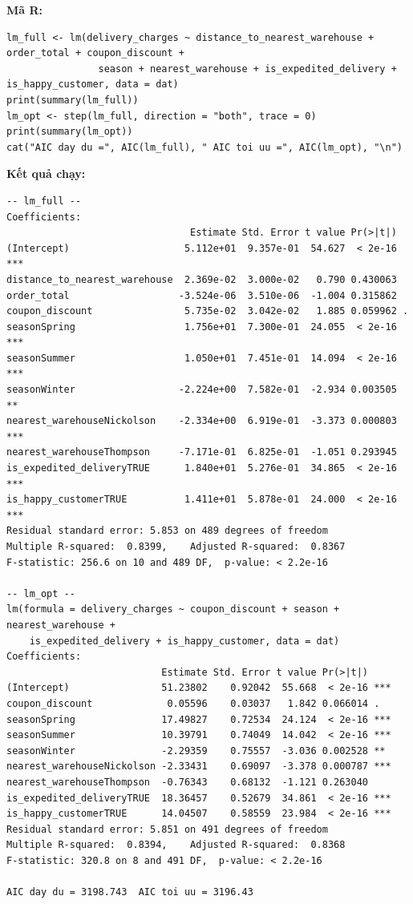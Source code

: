 \textbf{Mã R:}
\begin{lstlisting}
lm_full <- lm(delivery_charges ~ distance_to_nearest_warehouse + order_total + coupon_discount +
                season + nearest_warehouse + is_expedited_delivery + is_happy_customer, data = dat)
print(summary(lm_full))
lm_opt <- step(lm_full, direction = "both", trace = 0)  
print(summary(lm_opt))
cat("AIC day du =", AIC(lm_full), " AIC toi uu =", AIC(lm_opt), "\n")
\end{lstlisting}
\textbf{Kết quả chạy:}
\begin{lstlisting}[style=rout]
-- lm_full --
Coefficients:
                                Estimate Std. Error t value Pr(>|t|)    
(Intercept)                    5.112e+01  9.357e-01  54.627  < 2e-16 ***
distance_to_nearest_warehouse  2.369e-02  3.000e-02   0.790 0.430063    
order_total                   -3.524e-06  3.510e-06  -1.004 0.315862    
coupon_discount                5.735e-02  3.042e-02   1.885 0.059962 .  
seasonSpring                   1.756e+01  7.300e-01  24.055  < 2e-16 ***
seasonSummer                   1.050e+01  7.451e-01  14.094  < 2e-16 ***
seasonWinter                  -2.224e+00  7.582e-01  -2.934 0.003505 ** 
nearest_warehouseNickolson    -2.334e+00  6.919e-01  -3.373 0.000803 ***
nearest_warehouseThompson     -7.171e-01  6.825e-01  -1.051 0.293945    
is_expedited_deliveryTRUE      1.840e+01  5.276e-01  34.865  < 2e-16 ***
is_happy_customerTRUE          1.411e+01  5.878e-01  24.000  < 2e-16 ***
Residual standard error: 5.853 on 489 degrees of freedom
Multiple R-squared:  0.8399,	Adjusted R-squared:  0.8367 
F-statistic: 256.6 on 10 and 489 DF,  p-value: < 2.2e-16

-- lm_opt --
lm(formula = delivery_charges ~ coupon_discount + season + nearest_warehouse + 
    is_expedited_delivery + is_happy_customer, data = dat)
Coefficients:
                           Estimate Std. Error t value Pr(>|t|)    
(Intercept)                51.23802    0.92042  55.668  < 2e-16 ***
coupon_discount             0.05596    0.03037   1.842 0.066014 .  
seasonSpring               17.49827    0.72534  24.124  < 2e-16 ***
seasonSummer               10.39791    0.74049  14.042  < 2e-16 ***
seasonWinter               -2.29359    0.75557  -3.036 0.002528 ** 
nearest_warehouseNickolson -2.33431    0.69097  -3.378 0.000787 ***
nearest_warehouseThompson  -0.76343    0.68132  -1.121 0.263040    
is_expedited_deliveryTRUE  18.36457    0.52679  34.861  < 2e-16 ***
is_happy_customerTRUE      14.04507    0.58559  23.984  < 2e-16 ***
Residual standard error: 5.851 on 491 degrees of freedom
Multiple R-squared:  0.8394,	Adjusted R-squared:  0.8368 
F-statistic: 320.8 on 8 and 491 DF,  p-value: < 2.2e-16

AIC day du = 3198.743  AIC toi uu = 3196.43 
\end{lstlisting}

